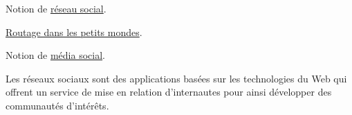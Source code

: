 
\begin{jazzitemize}
\item Notion de \href{https://fr.wikipedia.org/wiki/Analyse_des_r\%C3\%A9seaux_sociaux}{réseau social}.
\item \href{https://interstices.info/routage-dans-les-petits-mondes/}{Routage dans les petits mondes}.
\item Notion de \href{https://fr.wikipedia.org/wiki/M\%C3\%A9dia_social}{média social}.
\end{jazzitemize}


\begin{tcolorbox}[title={Introduction}, toprule=0pt, leftrule=0pt, rightrule=0pt, arc=0pt, fonttitle=\scshape\boxtitlefont,
                  colbacktitle=white, coltitle=firstcolor, colframe=firstcolor, colback=firstcolor!10,
                  breakable, enhanced jigsaw]
Les réseaux sociaux sont des applications basées sur les technologies du Web qui offrent un service de mise en relation d’internautes pour ainsi développer des communautés d’intérêts.

\end{tcolorbox}

